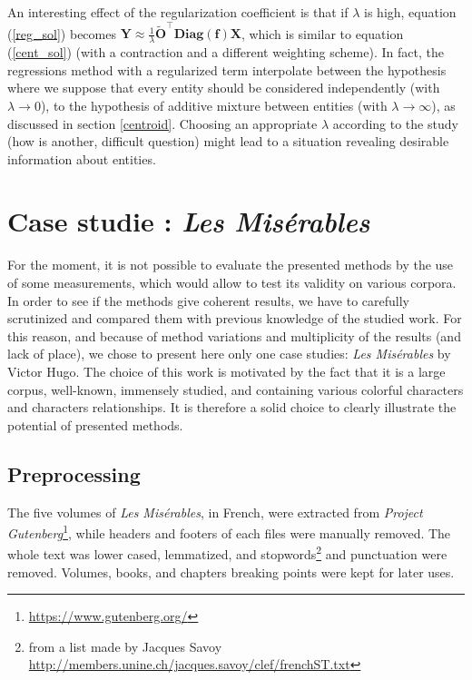 \documentclass[
twocolumn,
]{ceurart}
\begin{document}
An interesting effect of the regularization coefficient is that if $\lambda$ is high, equation (\ref{reg_sol}) becomes $\mathbf{Y} \approx \frac{1}{\lambda} \widetilde{\mathbf{O}}^\top \textbf{Diag}(\mathbf{f}) \mathbf{X}$, which is similar to equation (\ref{cent_sol}) (with a contraction and a different weighting scheme). In fact, the regressions method with a regularized term interpolate between the hypothesis where we suppose that every entity should be considered independently (with $\lambda \to 0$), to the hypothesis of additive mixture between entities (with $\lambda \to \infty$), as discussed in section \ref{centroid}. Choosing an appropriate $\lambda$ according to the study (how is another, difficult question) might lead to a situation revealing desirable information about entities.

\section{Case studie : \emph{Les Misérables}}
\label{case_studie}

For the moment, it is not possible to evaluate the presented methods by the use of some measurements, which would allow to test its validity on various corpora. In order to see if the methods give coherent results, we have to carefully scrutinized and compared them with previous knowledge of the studied work. For this reason, and because of method variations and multiplicity of the results (and lack of place), we chose to present here only one case studies: \emph{Les Misérables} by Victor Hugo. The choice of this work is motivated by the fact that it is a large corpus, well-known, immensely studied, and containing various colorful characters and characters relationships. It is therefore a solid choice to clearly illustrate the potential of presented methods.

\subsection{Preprocessing}

The five volumes of \emph{Les Misérables}, in French, were extracted from \emph{Project Gutenberg}\footnote{\url{https://www.gutenberg.org/}}, while headers and footers of each files were manually removed. The whole text was lower cased, lemmatized, and stopwords\footnote{from a list made by Jacques Savoy \url{http://members.unine.ch/jacques.savoy/clef/frenchST.txt}} and punctuation were removed. Volumes, books, and chapters breaking points were kept for later uses. 
\end{document}
